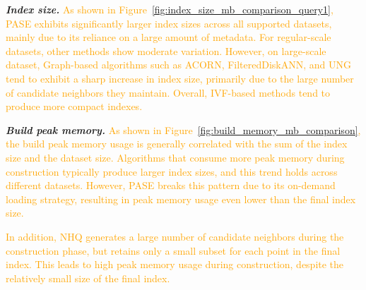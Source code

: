\documentclass[sigconf, nonacm]{acmart}
\begin{document}
{\textit{\textbf{Index size.}}
\textcolor{orange}{
	As shown in Figure~\ref{fig:index_size_mb_comparison_query1}, PASE exhibits significantly larger index sizes across all supported datasets, mainly due to its reliance on a large amount of metadata. For regular-scale datasets, other methods show moderate variation. However, on large-scale dataset, Graph-based algorithms such as ACORN, FilteredDiskANN, and UNG tend to exhibit a sharp increase in index size, primarily due to the large number of candidate neighbors they maintain. Overall, IVF-based methods tend to produce more compact indexes.
}



\textit{\textbf{Build peak memory.}}
% 
\textcolor{orange}{As shown in Figure~\ref{fig:build_memory_mb_comparison}, the build peak memory usage is generally correlated with the sum of the index size and the dataset size. Algorithms that consume more peak memory during construction typically produce larger index sizes, and this trend holds across different datasets. However, PASE breaks this pattern due to its on-demand loading strategy, resulting in peak memory usage even lower than the final index size.}

\textcolor{orange}{
In addition, NHQ generates a large number of candidate neighbors during the construction phase, but retains only a small subset for each point in the final index. This leads to high peak memory usage during construction, despite the relatively small size of the final index.}

}
\end{document}
